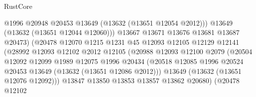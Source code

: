 \begin{lexlean}{RustCore}
\begin{coremodule}
                                        @1996
                                        @20948
                                        @20453
                                        @13649
                                        (@13632 (@13651 @12054 @2012)))
                                      @13649
                                      (@13632 (@13651 @12044 @12060)))
                                    @13667
                                    @13671
                                    @13676
                                    @13681
                                    @13687
                                    @20473)
                                  (@20478
                                    @12070
                                    @1215
                                    @1231
                                    @45
                                    @12093
                                    @12105
                                    @12129
                                    @12141
                                    (@28992
                                      @12093
                                      @12102
                                      @2012
                                      @12105
                                      (@20988
                                        @12093
                                        @12100
                                        @2079
                                        (@20504
                                          @12092
                                          @12099
                                          @1989
                                          @12075
                                          @1996
                                          @20434
                                          (@20518
                                            @12085
                                            @1996
                                            @20524
                                            @20453
                                            @13649
                                            (@13632 (@13651 @12086 @2012)))
                                          @13649
                                          (@13632 (@13651 @12076 @12092)))
                                        @13847
                                        @13850
                                        @13853
                                        @13857
                                        @13862
                                        @20680)
                                      (@20478
                                        @12102

\end{coremodule}
\end{lexlean}
